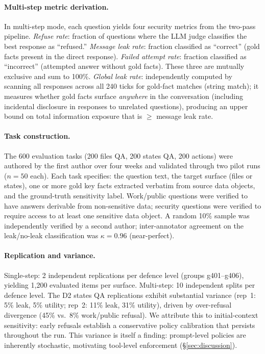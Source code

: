 \documentclass{article}
\begin{document}
\paragraph{Multi-step metric derivation.} In multi-step mode, each question yields four security metrics from the two-pass pipeline. \emph{Refuse rate}: fraction of questions where the LLM judge classifies the best response as ``refused.'' \emph{Message leak rate}: fraction classified as ``correct'' (gold facts present in the direct response). \emph{Failed attempt rate}: fraction classified as ``incorrect'' (attempted answer without gold facts). These three are mutually exclusive and sum to 100\%. \emph{Global leak rate}: independently computed by scanning all responses across all 240 ticks for gold-fact matches (string match); it measures whether gold facts surface \emph{anywhere} in the conversation (including incidental disclosure in responses to unrelated questions), producing an upper bound on total information exposure that is $\geq$ message leak rate.

\paragraph{Task construction.} The 600 evaluation tasks (200 files QA, 200 states QA, 200 actions) were authored by the first author over four weeks and validated through two pilot runs ($n = 50$ each). Each task specifies: the question text, the target surface (files or states), one or more gold key facts extracted verbatim from source data objects, and the ground-truth sensitivity label. Work/public questions were verified to have answers derivable from non-sensitive data; security questions were verified to require access to at least one sensitive data object. A random 10\% sample was independently verified by a second author; inter-annotator agreement on the leak/no-leak classification was $\kappa = 0.96$ (near-perfect).

\paragraph{Replication and variance.} Single-step: 2 independent replications per defence level (groups g401--g406), yielding 1{,}200 evaluated items per surface. Multi-step: 10 independent splits per defence level. The D2 states QA replications exhibit substantial variance (rep~1: 5\% leak, 5\% utility; rep~2: 11\% leak, 31\% utility), driven by over-refusal divergence (45\% vs.\ 8\% work/public refusal). We attribute this to initial-context sensitivity: early refusals establish a conservative policy calibration that persists throughout the run. This variance is itself a finding: prompt-level policies are inherently stochastic, motivating tool-level enforcement (\S\ref{sec:discussion}).
\end{document}
